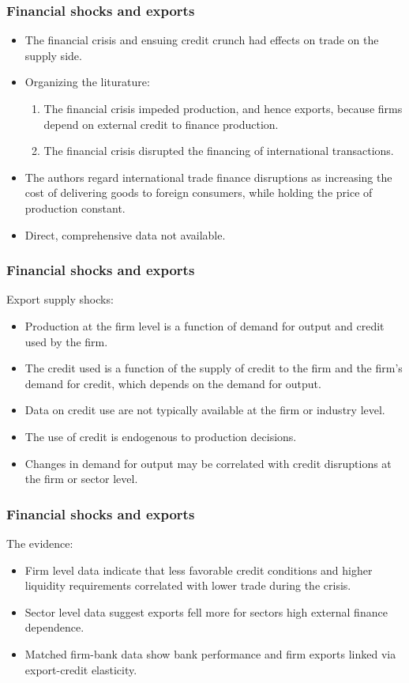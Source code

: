 \documentclass{beamer}
\begin{document}
\begin{frame}
  \frametitle{Financial shocks and exports}
  \begin{itemize}
  \item The financial crisis and ensuing credit crunch had effects on trade on
    the supply side.
  \item Organizing the liturature:
    \begin{enumerate}
    \item The financial crisis impeded production, and hence exports, because firms depend on external credit to finance production.
    \item The financial crisis disrupted the financing of international transactions.
    \end{enumerate}
  \item The authors regard international trade finance disruptions as increasing
    the cost of delivering goods to foreign consumers, while holding the price
    of production constant.
  \item Direct, comprehensive data not available.
  \end{itemize}
\end{frame}

\begin{frame}
  \frametitle{Financial shocks and exports}
  Export supply shocks:
  \begin{itemize}
  \item Production at the firm level is a function of demand for output and credit used by the firm.
  \item The credit used is a function of the supply of credit to the firm and
    the firm’s demand for credit, which depends on the demand for output.
  \item Data on credit use are not typically available at the firm or industry level.
  \item The use of credit is endogenous to production decisions.
  \item Changes in demand for output may be correlated with credit disruptions at the firm or sector level.
  \end{itemize}
\end{frame}

\begin{frame}
  \frametitle{Financial shocks and exports}
  The evidence:
  \begin{itemize}
  \item Firm level data indicate that less favorable credit conditions and
    higher liquidity requirements correlated with lower trade during the crisis.
  \item Sector level data suggest exports fell more for sectors high
    external finance dependence.
  \item Matched firm-bank data show bank performance and firm exports linked via export-credit elasticity.
  \end{itemize}
\end{frame}
\end{document}
